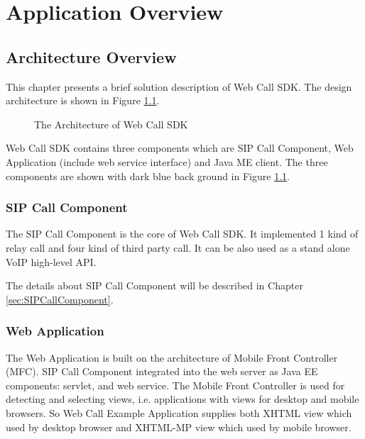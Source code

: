 
\chapter{Application Overview}
\label{sec:WebCallSDKArchitecture}

\section{Architecture Overview}
\label{sec:WebCallSDKArchitecture:ArchitectureOverview}

This chapter presents a brief solution description of Web Call SDK. The design architecture is shown in Figure \ref{fig:ArchitectureOfWebCallSDK}.

\begin{figure}[!hbtp]
\centering
{}
\caption{The Architecture of Web Call SDK}
\label{fig:ArchitectureOfWebCallSDK}
\end{figure}

Web Call SDK contains three components which are SIP Call Component, Web Application (include web service interface) and Java ME client. The three components are shown with dark blue back ground in Figure \ref{fig:ArchitectureOfWebCallSDK}.

\subsection{SIP Call Component}

The SIP Call Component is the core of Web Call SDK. It implemented 1 kind of relay call and four kind of third party call. It can be also used as a stand alone VoIP high-level API. 

The details about SIP Call Component will be described in Chapter \ref{sec:SIPCallComponent}.

\subsection{Web Application}

The Web Application is built on the architecture of Mobile Front Controller (MFC). SIP Call Component integrated into the web server as Java EE components: servlet, and web service. The Mobile Front Controller is used for detecting and selecting views, i.e. applications with views for desktop and mobile browsers. So Web Call Example Application supplies both XHTML view which used by desktop browser and XHTML-MP view which used by mobile browser. 

